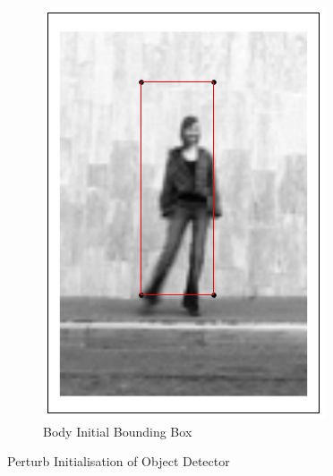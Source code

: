 \begin{figure}[h!]
\begin{subfigure}[b]{0.1\textwidth}
            \includegraphics[width=\textwidth]{supports/Segmentation_Measure/body}
        \caption{Body Initial Bounding Box}
    \end{subfigure}
    \caption{Perturb Initialisation of Object Detector}
    \label{fig:seg_init}
\end{figure}

